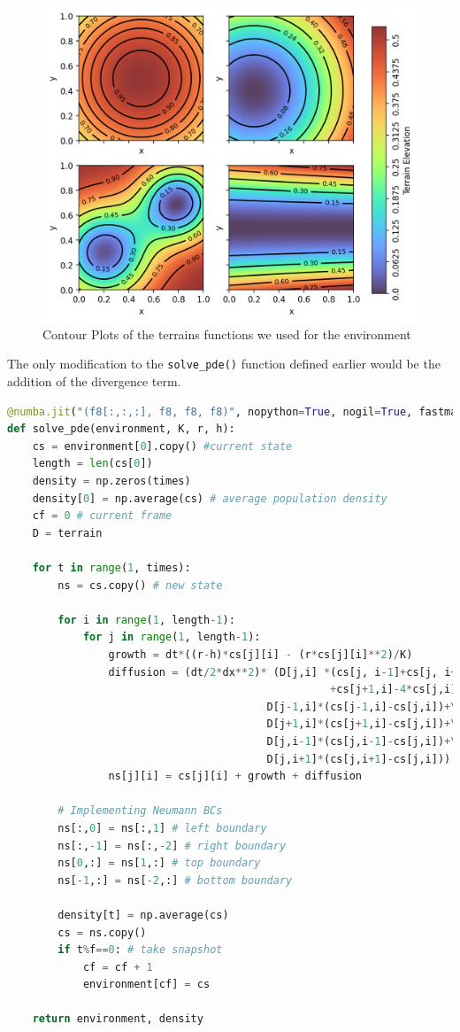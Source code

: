 \begin{figure}[H]
    \centering
    \includegraphics[width=0.7\linewidth]{Figures/5/5c/terrains.png}
    \caption{Contour Plots of the terrains functions we used for the environment}
\end{figure}

The only modification to the \verb|solve_pde()| function defined earlier would be the addition of the divergence term.

\begin{lstlisting}[language=Python, caption=Modified PDE solver function]
@numba.jit("(f8[:,:,:], f8, f8, f8)", nopython=True, nogil=True, fastmath = True)
def solve_pde(environment, K, r, h):
    cs = environment[0].copy() #current state
    length = len(cs[0])
    density = np.zeros(times)
    density[0] = np.average(cs) # average population density
    cf = 0 # current frame
    D = terrain

    for t in range(1, times):
        ns = cs.copy() # new state

        for i in range(1, length-1):
            for j in range(1, length-1):
                growth = dt*((r-h)*cs[j][i] - (r*cs[j][i]**2)/K)
                diffusion = (dt/2*dx**2)* (D[j,i] *(cs[j, i-1]+cs[j, i+1]+cs[j-1,i]\
                                                   +cs[j+1,i]-4*cs[j,i]) +\
                                         D[j-1,i]*(cs[j-1,i]-cs[j,i])+\
                                         D[j+1,i]*(cs[j+1,i]-cs[j,i])+\
                                         D[j,i-1]*(cs[j,i-1]-cs[j,i])+\
                                         D[j,i+1]*(cs[j,i+1]-cs[j,i]))
                ns[j][i] = cs[j][i] + growth + diffusion

        # Implementing Neumann BCs
        ns[:,0] = ns[:,1] # left boundary
        ns[:,-1] = ns[:,-2] # right boundary
        ns[0,:] = ns[1,:] # top boundary
        ns[-1,:] = ns[-2,:] # bottom boundary
        
        density[t] = np.average(cs)
        cs = ns.copy()
        if t%f==0: # take snapshot
            cf = cf + 1
            environment[cf] = cs
            
    return environment, density
\end{lstlisting}

